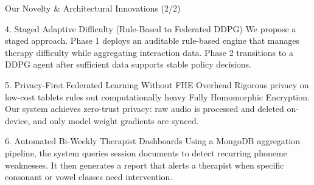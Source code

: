 \documentclass[aspectratio=169, 11pt, xcolor=table]{beamer}
\begin{document}
\begin{frame}{Our Novelty \& Architectural Innovations (2/2)}
    \vspace{-2mm}
    \begin{block}{\small 4. Staged Adaptive Difficulty (Rule-Based to Federated DDPG)}
        \footnotesize
        We propose a staged approach. Phase 1 deploys an auditable rule-based engine that manages therapy difficulty while aggregating interaction data. Phase 2 transitions to a DDPG agent after sufficient data supports stable policy decisions.
    \end{block}
    \vspace{2mm}
    
    \begin{block}{\small 5. Privacy-First Federated Learning Without FHE Overhead}
        \footnotesize
        Rigorous privacy on low-cost tablets rules out computationally heavy Fully Homomorphic Encryption. Our system achieves zero-trust privacy: raw audio is processed and deleted on-device, and only model weight gradients are synced.
    \end{block}
    \vspace{2mm}

    \begin{block}{\small 6. Automated Bi-Weekly Therapist Dashboards}
        \footnotesize
        Using a MongoDB aggregation pipeline, the system queries session documents to detect recurring phoneme weaknesses. It then generates a report that alerts a therapist when specific consonant or vowel classes need intervention.
    \end{block}
\end{frame}
\end{document}
